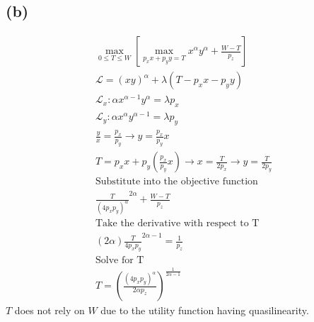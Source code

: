 \documentclass[10pt, a4paper]{article}
\begin{document}
    \subsection*{(b)}
      \begin{gather*}
        {\max_{0\leq T \leq W}} [\max_{p_xx + p_yy = T} x^{\alpha}y^{\alpha} + \frac{W-T}{p_z}] \\
        \mathcal{L} = (xy)^{\alpha} + \lambda(T-p_xx-p_yy)\\
        \mathcal{L}_x: \alpha x^{\alpha-1}y^{\alpha} = \lambda p_x \\
        \mathcal{L}_y: \alpha x^{\alpha}y^{\alpha-1} = \lambda p_y \\
        \frac{y}{x} = \frac{p_x}{p_y} \rightarrow y = \frac{p_x}{p_y}x \\
        T = p_xx + p_y(\frac{p_x}{p_y}x) \rightarrow x = \frac{T}{2p_x} \rightarrow y = \frac{T}{2p_y} \\
        \text{Substitute into the objective function} \\
        \frac{T}{(4p_xp_y)^{\alpha}}^{2\alpha} + \frac{W-T}{p_z} \\
        \text{Take the derivative with respect to T} \\
        (2\alpha)\frac{T}{4p_xp_y}^{2\alpha-1} = \frac{1}{p_z} \\
        \text{Solve for T} \\
        \boxed{T = (\frac{(4p_xp_y)^{\alpha}}{2\alpha p_z})^{\frac{1}{2\alpha-1}}}
      \end{gather*}
      $T$ does not rely on $W$ due to the utility function having quasilinearity.
\end{document}
